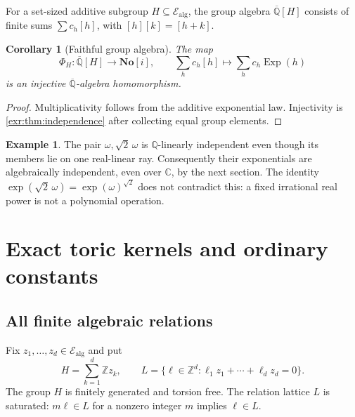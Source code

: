 \documentclass[11pt,letterpaper]{article}
\numberwithin{equation}{section}
\newtheorem{corollary}[corollary]{Corollary}
\theoremstyle{definition}
\newtheorem{example}[example]{Example}
\theoremstyle{remark}
\newcommand{\SC}{\mathbf{No}[i]}
\newcommand{\Z}{\mathbb Z}
\newcommand{\Q}{\mathbb Q}
\newcommand{\C}{\mathbb C}
\newcommand{\Qb}{\overline{\mathbb Q}}
\newcommand{\Ealg}{\mathcal E_{\mathrm{alg}}}
\newcommand{\Exp}{\operatorname{Exp}}
\begin{document}
For a set-sized additive subgroup $H\subseteq\Ealg$, the group algebra $\Qb[H]$
consists of finite sums $\sum c_h[h]$, with $[h][k]=[h+k]$.
\begin{corollary}[Faithful group algebra]\label{exr:cor:groupalgebra}
The map
\begin{equation}
 \Phi_H:\Qb[H]\longrightarrow\SC,\qquad
 \sum_h c_h[h]\longmapsto\sum_h c_h\Exp(h)
\end{equation}
is an injective $\Qb$-algebra homomorphism.
\end{corollary}
\begin{proof}
Multiplicativity follows from the additive exponential law. Injectivity is
\cref{exr:thm:independence} after collecting equal group elements.
\end{proof}

\begin{example}
The pair $\omega,\sqrt2\,\omega$ is $\Q$-linearly independent even though its
members lie on one real-linear ray. Consequently their exponentials are
algebraically independent, even over $\C$, by the next section. The identity
$\exp(\sqrt2\,\omega)=\exp(\omega)^{\sqrt2}$ does not contradict this: a fixed
irrational real power is not a polynomial operation.
\end{example}

\section{Exact toric kernels and ordinary constants}\label{exr:sec:toric}
\subsection{All finite algebraic relations}
Fix $z_1,\ldots,z_d\in\Ealg$ and put
\begin{equation}
 H=\sum_{k=1}^d\Z z_k,\qquad
 L=\{\ell\in\Z^d:\ell_1z_1+\cdots+\ell_dz_d=0\}.
\end{equation}
The group $H$ is finitely generated and torsion free. The relation lattice $L$ is
saturated: $m\ell\in L$ for a nonzero integer $m$ implies $\ell\in L$.
\end{document}
